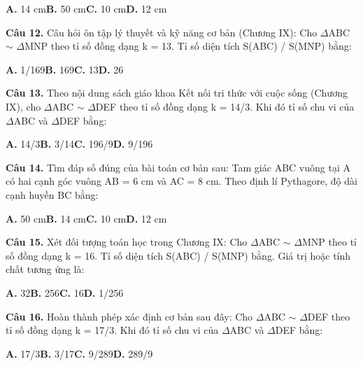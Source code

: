 \documentclass[11pt,a4paper]{article}
\begin{document}
\hspace*{1.5em}\textbf{A.} 14 cm\quad\quad \textbf{B.} 50 cm\quad\quad \textbf{C.} 10 cm\quad\quad \textbf{D.} 12 cm\par\vspace{2pt}
\textbf{\color{primary} Câu 12.} Câu hỏi ôn tập lý thuyết và kỹ năng cơ bản (Chương IX): Cho $\Delta$ABC $\sim$ $\Delta$MNP theo tỉ số đồng dạng k = 13. Tỉ số diện tích S(ABC) / S(MNP) bằng:\par
\hspace*{1.5em}\textbf{A.} 1/169\quad\quad \textbf{B.} 169\quad\quad \textbf{C.} 13\quad\quad \textbf{D.} 26\par\vspace{2pt}
\textbf{\color{primary} Câu 13.} Theo nội dung sách giáo khoa Kết nối tri thức với cuộc sống (Chương IX), cho $\Delta$ABC $\sim$ $\Delta$DEF theo tỉ số đồng dạng k = 14/3. Khi đó tỉ số chu vi của $\Delta$ABC và $\Delta$DEF bằng:\par
\hspace*{1.5em}\textbf{A.} 14/3\quad\quad \textbf{B.} 3/14\quad\quad \textbf{C.} 196/9\quad\quad \textbf{D.} 9/196\par\vspace{2pt}
\textbf{\color{primary} Câu 14.} Tìm đáp số đúng của bài toán cơ bản sau: Tam giác ABC vuông tại A có hai cạnh góc vuông AB = 6 cm và AC = 8 cm. Theo định lí Pythagore, độ dài cạnh huyền BC bằng:\par
\hspace*{1.5em}\textbf{A.} 50 cm\quad\quad \textbf{B.} 14 cm\quad\quad \textbf{C.} 10 cm\quad\quad \textbf{D.} 12 cm\par\vspace{2pt}
\textbf{\color{primary} Câu 15.} Xét đối tượng toán học trong Chương IX: Cho $\Delta$ABC $\sim$ $\Delta$MNP theo tỉ số đồng dạng k = 16. Tỉ số diện tích S(ABC) / S(MNP) bằng. Giá trị hoặc tính chất tương ứng là:\par
\hspace*{1.5em}\textbf{A.} 32\quad\quad \textbf{B.} 256\quad\quad \textbf{C.} 16\quad\quad \textbf{D.} 1/256\par\vspace{2pt}
\textbf{\color{primary} Câu 16.} Hoàn thành phép xác định cơ bản sau đây: Cho $\Delta$ABC $\sim$ $\Delta$DEF theo tỉ số đồng dạng k = 17/3. Khi đó tỉ số chu vi của $\Delta$ABC và $\Delta$DEF bằng:\par
\hspace*{1.5em}\textbf{A.} 17/3\quad\quad \textbf{B.} 3/17\quad\quad \textbf{C.} 9/289\quad\quad \textbf{D.} 289/9\par\vspace{2pt}
\end{document}
